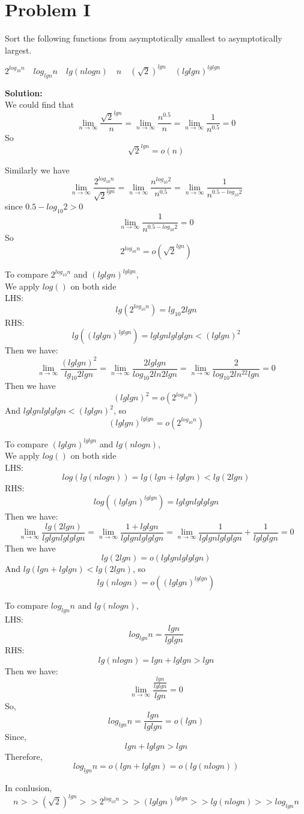 
\section{Problem I}
Sort the following functions from asymptotically smallest to asymptotically largest.

\begin{center}
	$ 2^{log_{10}{n}} \quad log_{lg{n}}{n} \quad  lg(nlog{n})  \quad  n \quad (\sqrt{2})^{lg{n}} \quad (lglgn)^{lglgn} $
\end{center}

\textbf{Solution:} \\

We could find that
$$\lim_{n\to\infty} \frac{\sqrt{2}^{lgn}}{n} = \lim_{n\to\infty} \frac{n^{0.5}}{n} = \lim_{n\to\infty} \frac{1}{n^{0.5}} = 0$$
So 
$$\sqrt{2}^{lgn} = o(n)$$

Similarly we have
$$\lim_{n\to\infty} \frac{2^{log_{10}n}}{\sqrt{2}^{lgn}} = \lim_{n\to\infty} \frac{n^{log_{10}2}}{n^{0.5}} = \lim_{n\to\infty} \frac{1}{n^{0.5 - log_{10}2}}$$
since $0.5 - log_{10}2 > 0$
$$ \lim_{n\to\infty} \frac{1}{n^{0.5 - log_{10}2}} = 0 $$
So 
$$ 2^{log_{10}n} = o(\sqrt{2}^{lgn})$$

To compare $2^{log_{10}n}$ and $(lglgn)^{lglgn}$,\\
We apply $log()$ on both side\\
LHS:
$$lg(2^{log_{10}n}) = lg_{10}2lgn$$
RHS:
$$lg((lglgn)^{lglgn}) = lglgn lglglgn < (lglgn)^2$$
Then we have:
$$ \lim_{n\to\infty} \frac{(lglgn)^2}{lg_{10}2lgn} = \lim_{n\to\infty} \frac{2lglgn}{log_{10}2ln2lgn}  = \lim_{n\to\infty} \frac{2}{log_{10}2ln^22lgn} = 0$$
Then we have
$$ (lglgn)^2 = o(2^{log_{10}n}) $$
And $lglgn lglglgn < (lglgn)^2$, so
$$ (lglgn)^{lglgn} = o(2^{log_{10}n}) $$

To compare $(lglgn)^{lglgn}$ and $lg(nlog{n})$,\\
We apply $log()$ on both side\\
LHS:
$$log(lg(nlog{n})) = lg(lgn + lglgn) < lg(2lgn)$$
RHS:
$$log((lglgn)^{lglgn}) = lglgn lglglgn$$
Then we have:
$$\lim_{n\to\infty} \frac{lg(2lgn)}{lglgn lglglgn} = \lim_{n\to\infty} \frac{1 + lglgn}{lglgn lglglgn}  = \lim_{n\to\infty} \frac{1}{lglgn lglglgn} + \frac{1}{lglglgn} = 0$$
Then we have
$$ lg(2lgn) = o(lglgn lglglgn) $$
And $lg(lgn + lglgn) < lg(2lgn)$, so
$$ lg(nlog{n}) = o((lglgn)^{lglgn}) $$

To compare $log_{lg{n}}{n}$ and $lg(nlog{n})$,\\
LHS:
$$log_{lg{n}}{n} = \frac{lgn}{lglgn}$$
RHS:
$$lg(nlog{n}) = lgn + lglgn > lgn$$
Then we have:
$$\lim_{n\to\infty} \frac{\frac{lgn}{lglgn}}{lgn} = 0$$
So, 
$$log_{lg{n}}{n} = \frac{lgn}{lglgn} = o(lgn)$$
Since,
$$lgn + lglgn > lgn$$
Therefore, 
$$log_{lg{n}}{n} = o(lgn + lglgn) = o(lg(nlog{n}))$$

In conlusion, 
$$n >> (\sqrt{2})^{lg{n}} >> 2^{log_{10}{n}} >> (lglgn)^{lglgn} >> lg(nlog{n}) >> log_{lg{n}}{n}$$
